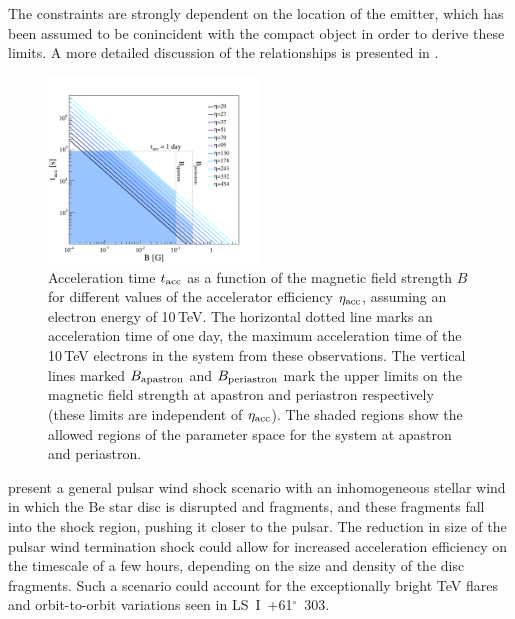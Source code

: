 \documentclass[preprint2]{aastex}
\newcommand{\lsi}{LS~I~+61$^{\circ}$~303}
\newcommand{\tev}{\,TeV}
\begin{document}
The constraints are strongly dependent on the location of the emitter, which has been assumed to be conincident with the compact object in order to derive these limits. A more detailed discussion of the relationships is presented in \citet{2008MNRAS.383..467K}.

\begin{figure}[ht]
\centering
\includegraphics[width=0.5\textwidth]{figs/taccvsB_areas.pdf}
\caption{Acceleration time $t_{\mbox{\scriptsize{acc}}}$ as a function of the magnetic field strength $B$ for different values of the accelerator efficiency $\eta_{\mbox{\scriptsize{acc}}}$, assuming an electron energy of 10\tev{}. The horizontal dotted line marks an acceleration time of one day, the maximum acceleration time of the 10\tev{} electrons in the system from these observations. The vertical lines marked $B_{\mbox{\scriptsize{apastron}}}$ and $B_{\mbox{\scriptsize{periastron}}}$ mark the upper limits on the magnetic field strength at apastron and periastron respectively (these limits are independent of $\eta_{\mbox{\scriptsize{acc}}}$). The shaded regions show the allowed regions of the parameter space for the system at apastron and periastron.}
\label{f:tacc}
\end{figure}


\citet{Paredes-Fortuny2014} present a general pulsar wind shock scenario with an inhomogeneous stellar wind in which the Be star disc is disrupted and fragments, and these fragments fall into the shock region, pushing it closer to the pulsar. The reduction in size of the pulsar wind termination shock could allow for increased acceleration efficiency on the timescale of a few hours, depending on the size and density of the disc fragments. Such a scenario could account for the exceptionally bright TeV flares and orbit-to-orbit variations seen in \lsi{}.
\vspace{2ex}
\end{document}
